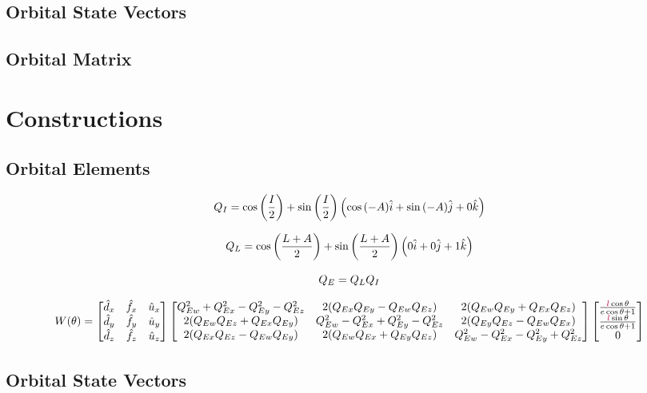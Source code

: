 	\subsection{Orbital State Vectors}
	\subsection{Orbital Matrix}
	
\section{Constructions}
	\subsection{Orbital Elements}
		$$Q_{I} = \cos{\left( \frac{I}{2} \right)} + \sin{\left( \frac{I}{2} \right)} \left( \cos{\left( -A\right)}\hat{\textcolor{black}{i}} + \sin{\left( -A\right)}\hat{\textcolor{black}{j}} + 0\hat{\textcolor{black}{k}} \right)$$
		
		$$Q_{L} = \cos{\left( \frac{L+ A}{2} \right)} + \sin{\left( \frac{L+ A}{2} \right)}\left(0\hat{\textcolor{black}{i}} + 0\hat{\textcolor{black}{j}} + 1\hat{\textcolor{black}{k}}\right)$$
		
		$$Q_E = Q_{L}Q_{I}$$
		
		$$W(\theta)=
		\begin{bmatrix}
		\hat{d}_x & \hat{f}_x & \hat{u}_x \\
		\hat{d}_y & \hat{f}_y & \hat{u}_y \\
		\hat{d}_z & \hat{f}_z & \hat{u}_z
		\end{bmatrix}
\begin{bmatrix}
Q_{Ew}^2 + Q_{Ex}^2 - Q_{Ey}^2 - Q_{Ez}^2 & 2(Q_{Ex}Q_{Ey} - Q_{Ew}Q_{Ez}) & 2(Q_{Ew}Q_{Ey} + Q_{Ex}Q_{Ez})\\
2(Q_{Ew}Q_{Ez} + Q_{Ex}Q_{Ey}) & Q_{Ew}^2 - Q_{Ex}^2 + Q_{Ey}^2 - Q_{Ez}^2 & 2(Q_{Ey}Q_{Ez} - Q_{Ew}Q_{Ex})\\
2(Q_{Ex}Q_{Ez} - Q_{Ew}Q_{Ey}) & 2(Q_{Ew}Q_{Ex} + Q_{Ey}Q_{Ez}) & Q_{Ew}^2 - Q_{Ex}^2 - Q_{Ey}^2 + Q_{Ez}^2
\end{bmatrix}
   		\begin{bmatrix}
   		\frac{\textcolor{purple}{l}\cos{\theta}}{\textcolor{black}{e}\cos{\theta}+1} \\
   		\frac{\textcolor{purple}{l}\sin{\theta}}{\textcolor{black}{e}\cos{\theta}+1} \\
   		0
   		\end{bmatrix}
		$$
		
	\subsection{Orbital State Vectors}
	
